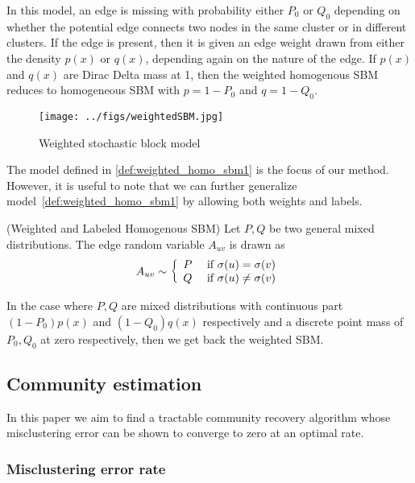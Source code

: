 \documentclass{article}
\begin{document}
In this model, an edge is missing with probability either $P_0$ or $Q_0$ depending on whether the potential edge connects two nodes in the same cluster or in different clusters. If the edge is present, then it is given an edge weight drawn from either the density $p(x)$ or $q(x)$, depending again on the nature of the edge. If $p(x)$ and $q(x)$ are Dirac Delta mass at 1, then the weighted homogenous SBM reduces to homogeneous SBM with $p = 1 - P_0$ and $q = 1 - Q_0$. 

\begin{figure}[htp]
\centering
\texttt{[image: ../figs/weightedSBM.jpg]}
\caption{Weighted stochastic block model}
\label{fig:weighted_stochastic_block_model}
\end{figure}


The model defined in \ref{def:weighted_homo_sbm1} is the focus of our method. However, it is useful to note that we can further generalize model~\ref{def:weighted_homo_sbm1} by allowing both weights and labels. 

\begin{definition} \label{def:weighted_homo_sbm2}
(Weighted and Labeled Homogenous SBM) Let $P, Q$ be two general mixed distributions. The edge random variable $A_{uv}$ is drawn as
\[
A_{uv} \sim \left\{ 
   \begin{array}{cc} 
   P & \textrm{ if } \sigma(u) = \sigma(v) \\
   Q & \textrm{ if } \sigma(u) \neq \sigma(v)
   \end{array} \right.
\]
\end{definition}
In the case where $P, Q$ are mixed distributions with continuous part $(1-P_0) p(x)$ and $(1-Q_0) q(x)$ respectively and a discrete point mass of $P_0, Q_0$ at zero respectively, then we get back the weighted SBM. 

\subsection{Community estimation}

In this paper we aim to find a tractable community recovery algorithm whose misclustering error can be shown to converge to zero at an optimal rate.

\subsubsection{Misclustering error rate}
\end{document}
